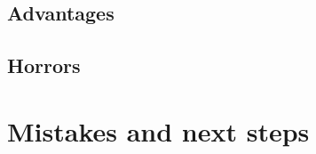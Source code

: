 \documentclass[xcolor=dvipsnames]{beamer}
\begin{document}
\subsection{Advantages}

\subsection{Horrors}



\section[Next steps]{Mistakes and next steps}
\end{document}
